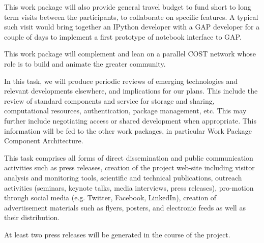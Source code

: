 \begin{workpackage}
\begin{wpdescription}
  This work package will also provide general travel budget to fund
  short to long term visits between the participants, to collaborate
  on specific features. A typical such visit would bring together an
  IPython developer with a GAP developer for a couple of days to
  implement a first prototype of notebook interface to GAP.

  This work package will complement and lean on a parallel COST
  network whose role is to build and animate the greater community.
\end{wpdescription}

\begin{tasklist}
\begin{task}[title=Reviewing emerging technologies, id=tech-review]
  In this task, we will produce periodic reviews of emerging
  technologies and relevant developments elsewhere, and implications
  for our plans. This include the review of standard components and
  service for storage and sharing, computational resources,
  authentication, package management, etc. This may further include
  negotiating access or shared development when appropriate. This
  information will be fed to the other work packages, in particular
  Work Package~ Component Architecture.
\end{task}

\begin{task}[title=Dissemination and Communication activities, id=dissemination-communication]


  This task comprises all forms of direct dissemination and public
  communication activities such as press releases, creation of the
  project web-site including visitor analysis and monitoring tools,
  scientific and technical publications, outreach activities
  (seminars, keynote talks, media interviews, press releases),
  pro-motion through social media (e.g. Twitter, Facebook, LinkedIn),
  creation of advertisement materials such as flyers, posters, and
  electronic feeds as well as their distribution.


  At least two press releases will be generated in the course of the
  project.
  
\end{task}


\end{tasklist}
\end{workpackage}
